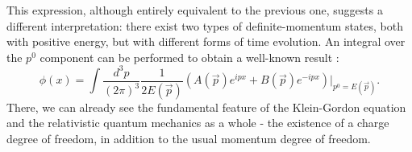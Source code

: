 \documentclass[11pt]{article}
\numberwithin{equation}{section}
\begin{document}
     This expression, although entirely equivalent to the previous one, suggests a different interpretation: there exist two types
     of definite-momentum states, both with positive energy, but with different forms of time evolution.
     An integral over the $p^0$ component can be performed to obtain a well-known result \cite{peskin}:%
     \begin{equation}
       \phi(x) = \int \frac{d^3p}{(2\pi)^3} \frac{1}{2 E(\vec p)} \left( A(\vec p) e^{ipx} + B(\vec p) e^{-ipx} \right) \Big|_{p^0 = E(\vec p)}.
     \end{equation}
     There, we can already see the fundamental feature of the Klein-Gordon equation and the 
     relativistic quantum mechanics as a whole - the existence of a charge degree of freedom, in addition to the usual momentum degree of freedom.
\end{document}
